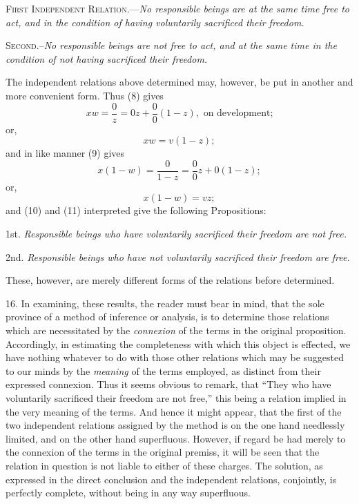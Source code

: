 \documentclass[oneside]{book}
\begin{document}
\textsc{First Independent Relation}.---\textit{No responsible beings are at
the same time free to act, and in the condition of having voluntarily
sacrificed their freedom.}

\textsc{Second}.--\textit{No responsible beings are not free to act, and at the
same time in the condition of not having sacrificed their freedom.}

The independent relations above determined may, however,
be put in another and more convenient form. Thus (8) gives
\[
xw=\frac{0}{z}=0z+\frac{0}{0}(1-z), \textrm{ on development;}
\]
or,
\begin{equation}
xw=v(1-z);
\end{equation}
and in like manner (9) gives
\[
x(1-w)=\frac{0}{1-z}=\frac{0}{0}z+0(1-z);
\]
or,
\begin{equation}
x (1 - w) = vz;
\end{equation}
and (10) and (11) interpreted give the following Propositions:

1st. \textit{Responsible beings who have voluntarily sacrificed their freedom
are not free.}

2nd. \textit{Responsible beings who have not voluntarily sacrificed their
freedom are free.}

These, however, are merely different forms of the relations
before determined.

16. In examining, these results, the reader must bear in mind,
that the sole province of a method of inference or analysis, is to
determine those relations which are necessitated by the \textit{connexion}
of the terms in the original proposition. Accordingly, in estimating the completeness with which this object is effected, we
have nothing whatever to do with those other relations which
may be suggested to our minds by the \textit{meaning} of the terms
employed, as distinct from their expressed connexion. Thus it
seems obvious to remark, that ``They who have voluntarily sacrificed
their freedom are not free,'' this being a relation implied
in the very meaning of the terms. And hence it might appear,
that the first of the two independent relations assigned by the method
is on the one hand needlessly limited, and on the other hand
superfluous. However, if regard be had merely to the connexion
of the terms in the original premiss, it will be seen that the relation
in question is not liable to either of these charges. The
solution, as expressed in the direct conclusion and the independent
relations, conjointly, is perfectly complete, without being
in any way superfluous.
\end{document}

